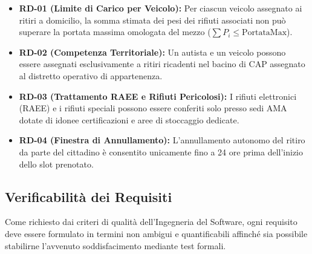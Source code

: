 \begin{itemize}
    \item \textbf{RD-01 (Limite di Carico per Veicolo):} Per ciascun veicolo assegnato ai ritiri a domicilio, la somma stimata dei pesi dei rifiuti associati non può superare la portata massima omologata del mezzo ($\sum P_i \le \text{PortataMax}$).
    \item \textbf{RD-02 (Competenza Territoriale):} Un autista e un veicolo possono essere assegnati esclusivamente a ritiri ricadenti nel bacino di CAP assegnato al distretto operativo di appartenenza.
    \item \textbf{RD-03 (Trattamento RAEE e Rifiuti Pericolosi):} I rifiuti elettronici (RAEE) e i rifiuti speciali possono essere conferiti solo presso sedi AMA dotate di idonee certificazioni e aree di stoccaggio dedicate.
    \item \textbf{RD-04 (Finestra di Annullamento):} L'annullamento autonomo del ritiro da parte del cittadino è consentito unicamente fino a 24 ore prima dell'inizio dello slot prenotato.
\end{itemize}

\subsection{Verificabilità dei Requisiti}
Come richiesto dai criteri di qualità dell'Ingegneria del Software, ogni requisito deve essere formulato in termini non ambigui e quantificabili affinché sia possibile stabilirne l'avvenuto soddisfacimento mediante test formali.

